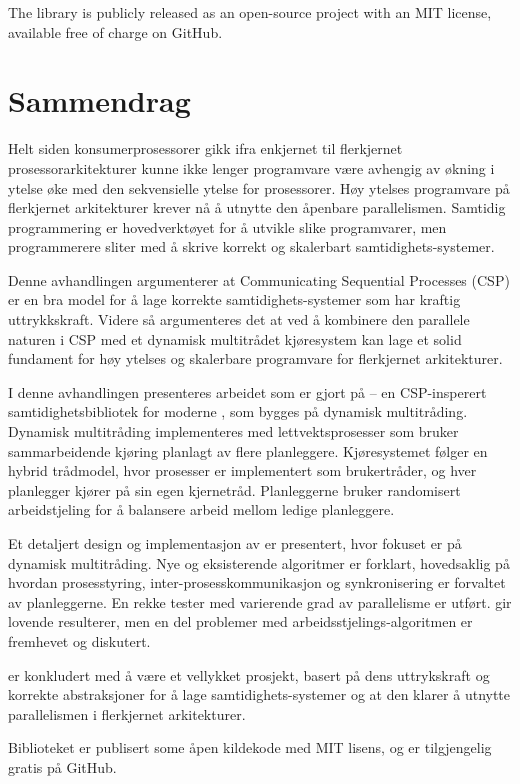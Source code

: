 The \Proxc{} library is publicly released as an open\hyp{}source project with an MIT license, available free of charge on GitHub.

\vfill

\afterpage{\blankpage}

\newpage
{}
\section*{Sammendrag}


Helt siden konsumerprosessorer gikk ifra enkjernet til flerkjernet prosessorarkitekturer kunne ikke lenger programvare være avhengig av økning i ytelse øke med den sekvensielle ytelse for prosessorer. Høy ytelses programvare på flerkjernet arkitekturer krever nå å utnytte den åpenbare parallelismen. Samtidig programmering er hovedverktøyet for å utvikle slike programvarer, men programmerere sliter med å skrive korrekt og skalerbart samtidighets-systemer.

Denne avhandlingen argumenterer at Communicating Sequential Processes (CSP) er en bra model for å lage korrekte samtidighets-systemer som har kraftig uttrykkskraft. Videre så argumenteres det at ved å kombinere den parallele naturen i CSP med et dynamisk multitrådet kjøresystem kan lage et solid fundament for høy ytelses og skalerbare programvare for flerkjernet arkitekturer.

I denne avhandlingen presenteres arbeidet som er gjort på \Proxc{} -- en CSP-insperert samtidighetsbibliotek for moderne \Cpp{}, som bygges på dynamisk multitråding. Dynamisk multitråding implementeres med lettvektsprosesser som bruker sammarbeidende kjøring planlagt av flere planleggere. Kjøresystemet følger en hybrid trådmodel, hvor prosesser er implementert som brukertråder, og hver planlegger kjører på sin egen kjernetråd. Planleggerne bruker randomisert arbeidstjeling for å balansere arbeid mellom ledige planleggere.

Et detaljert design og implementasjon av \Proxc{} er presentert, hvor fokuset er på dynamisk multitråding. Nye og eksisterende algoritmer er forklart, hovedsaklig på hvordan prosesstyring, inter-prosesskommunikasjon og synkronisering er forvaltet av planleggerne. En rekke tester med varierende grad av parallelisme er utført. \Proxc{} gir lovende resulterer, men en del problemer med arbeidsstjelings-algoritmen er fremhevet og diskutert.

\Proxc{} er konkludert med å være et vellykket prosjekt, basert på dens uttrykskraft og korrekte abstraksjoner for å lage samtidighets-systemer og at den klarer å utnytte parallelismen i flerkjernet arkitekturer.

Biblioteket \Proxc{} er publisert some åpen kildekode med MIT lisens, og er tilgjengelig gratis på GitHub.


\vfill

\afterpage{\blankpage}
